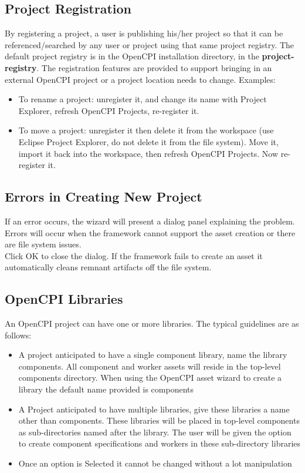 \documentclass[10pt, a4paper, oneside]{article}
\begin{document}
\subsection{Project Registration}
By registering a project, a user is publishing his/her project so that it can be referenced/searched by any user or project using that same project registry. The default project registry is in the OpenCPI installation directory, in the \textbf{ project-registry}. The registration features are provided to support bringing in an external OpenCPI project or a project location needs to change.
Examples:
\begin{itemize}
\item	To rename a project: unregister it, and change its name with Project Explorer, refresh OpenCPI Projects, re-register it.
\item	To move a project: unregister it then delete it from the workspace (use Eclipse Project Explorer, do not delete it from the file system). Move it, import it back into the workspace, then refresh OpenCPI Projects. Now re-register it.
\end{itemize}
\subsection{Errors in Creating New Project}
If an error occurs, the wizard will present a dialog panel explaining the problem. Errors will occur when the framework cannot support the asset creation or there are file system issues. \\

Click OK to close the dialog. If the framework fails to create an asset it automatically cleans remnant artifacts off the file system.
\subsection{OpenCPI Libraries}
An OpenCPI project can have one or more libraries. The typical guidelines are as follows:
\begin{itemize}
\item A project anticipated to have a single component library, name the library components. All component and worker assets will reside in the top-level components directory. When using the OpenCPI asset wizard to create a library the default name provided is components
\item A Project anticipated to have multiple libraries, give these libraries a name other than components. These libraries will be placed in top-level components as sub-directories named after the library. The user will be given the option to create component specifications and workers in these sub-directory libraries
\item Once an option is Selected it cannot be changed without a lot manipulation
\end{itemize}
\end{document}
